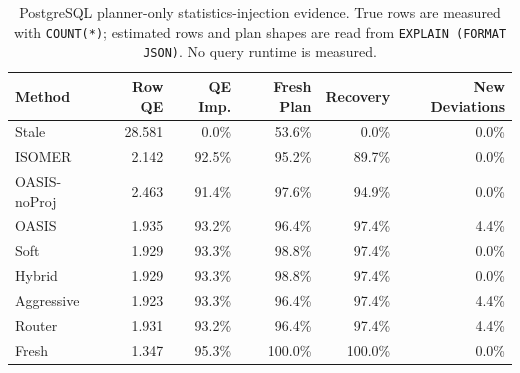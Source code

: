 \begin{table}[t]
  \centering
  \small
  \caption{PostgreSQL planner-only statistics-injection evidence. True rows are measured with \texttt{COUNT(*)}; estimated rows and plan shapes are read from \texttt{EXPLAIN (FORMAT JSON)}. No query runtime is measured.}
  \label{tab:postgres_planner_stats_injection}
  \setlength{\tabcolsep}{4pt}
  \begin{tabular}{lrrrrr}
    \toprule
    Method & Row QE & QE Imp. & Fresh Plan & Recovery & New Deviations \\
    \midrule
    Stale & 28.581 & 0.0\% & 53.6\% & 0.0\% & 0.0\% \\
    ISOMER & 2.142 & 92.5\% & 95.2\% & 89.7\% & 0.0\% \\
    OASIS-noProj & 2.463 & 91.4\% & 97.6\% & 94.9\% & 0.0\% \\
    OASIS & 1.935 & 93.2\% & 96.4\% & 97.4\% & 4.4\% \\
    Soft & 1.929 & 93.3\% & 98.8\% & 97.4\% & 0.0\% \\
    Hybrid & 1.929 & 93.3\% & 98.8\% & 97.4\% & 0.0\% \\
    Aggressive & 1.923 & 93.3\% & 96.4\% & 97.4\% & 4.4\% \\
    Router & 1.931 & 93.2\% & 96.4\% & 97.4\% & 4.4\% \\
    Fresh & 1.347 & 95.3\% & 100.0\% & 100.0\% & 0.0\% \\
    \bottomrule
  \end{tabular}
\end{table}
